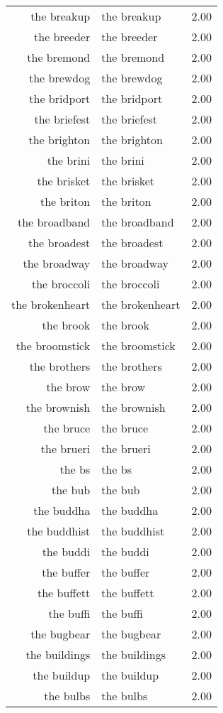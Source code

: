 \begin{table}[ht]
\begin{tabular}{rlr}
  the breakup & the breakup & 2.00 \\ 
  the breeder & the breeder & 2.00 \\ 
  the bremond & the bremond & 2.00 \\ 
  the brewdog & the brewdog & 2.00 \\ 
  the bridport & the bridport & 2.00 \\ 
  the briefest & the briefest & 2.00 \\ 
  the brighton & the brighton & 2.00 \\ 
  the brini & the brini & 2.00 \\ 
  the brisket & the brisket & 2.00 \\ 
  the briton & the briton & 2.00 \\ 
  the broadband & the broadband & 2.00 \\ 
  the broadest & the broadest & 2.00 \\ 
  the broadway & the broadway & 2.00 \\ 
  the broccoli & the broccoli & 2.00 \\ 
  the brokenheart & the brokenheart & 2.00 \\ 
  the brook & the brook & 2.00 \\ 
  the broomstick & the broomstick & 2.00 \\ 
  the brothers & the brothers & 2.00 \\ 
  the brow & the brow & 2.00 \\ 
  the brownish & the brownish & 2.00 \\ 
  the bruce & the bruce & 2.00 \\ 
  the brueri & the brueri & 2.00 \\ 
  the bs & the bs & 2.00 \\ 
  the bub & the bub & 2.00 \\ 
  the buddha & the buddha & 2.00 \\ 
  the buddhist & the buddhist & 2.00 \\ 
  the buddi & the buddi & 2.00 \\ 
  the buffer & the buffer & 2.00 \\ 
  the buffett & the buffett & 2.00 \\ 
  the buffi & the buffi & 2.00 \\ 
  the bugbear & the bugbear & 2.00 \\ 
  the buildings & the buildings & 2.00 \\ 
  the buildup & the buildup & 2.00 \\ 
  the bulbs & the bulbs & 2.00 \\ 

\end{tabular}
\end{table}

